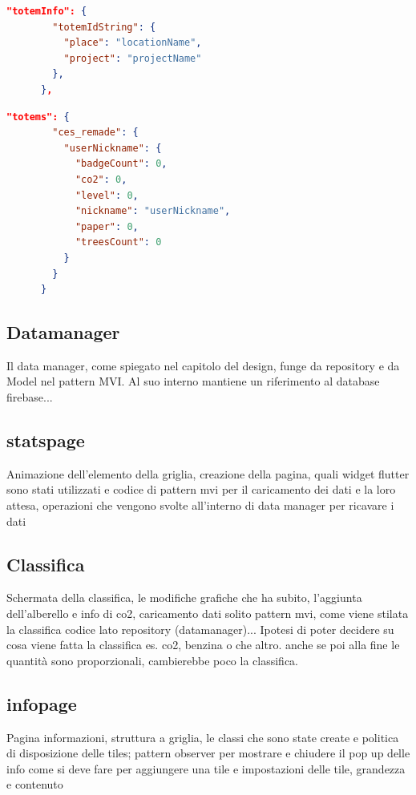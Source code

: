 \begin{lstlisting}[language=json, caption={}, label={lst:totemInfo}]
    "totemInfo": {
        "totemIdString": {
          "place": "locationName",
          "project": "projectName"
        },
      },
\end{lstlisting}  

\begin{lstlisting}[language=json, caption={}, label={lst:userDataTotem}]
      "totems": {
        "ces_remade": {
          "userNickname": {
            "badgeCount": 0,
            "co2": 0,
            "level": 0,
            "nickname": "userNickname",
            "paper": 0,
            "treesCount": 0
          }
        }
      }
\end{lstlisting}

\subsection{Datamanager}
Il data manager, come spiegato nel capitolo del design, funge da repository e da Model nel pattern MVI.
Al suo interno mantiene un riferimento al database firebase...



\subsection{statspage}
Animazione dell'elemento della griglia, creazione della pagina, quali widget flutter sono stati utilizzati e codice di pattern mvi per il caricamento dei dati e la loro attesa, operazioni che vengono svolte all'interno di data manager per ricavare i dati
\subsection{Classifica}
Schermata della classifica, le modifiche grafiche che ha subito, l'aggiunta dell'alberello e info di co2, caricamento dati solito pattern mvi, come viene stilata la classifica codice lato repository (datamanager)... Ipotesi di poter decidere su cosa viene fatta la classifica es. co2, benzina o che altro. anche se poi alla fine le quantità sono proporzionali, cambierebbe poco la classifica.

\subsection{infopage}
Pagina informazioni, struttura a griglia, le classi che sono state create e politica di disposizione delle tiles;  pattern observer per mostrare e chiudere il pop up delle info
come si deve fare per aggiungere una tile e impostazioni delle tile, grandezza e contenuto
